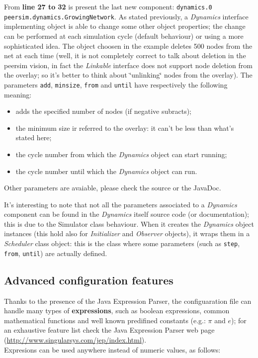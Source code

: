 \documentclass[a4paper,12pt]{article}
\begin{document}
From \textbf{line 27 to 32} is present the last new component: 
\texttt{dynamics.0
peersim.dynamics.GrowingNetwork}. As stated previously, a \emph{Dynamics}
interface implementing object is able to change some other object
properties; the change can be performed at each simulation cycle (default
behaviour) or using a more sophisticated idea. The object choosen
in the example deletes 500 nodes from the net at each time (well,
it is not completely correct to talk about deletion in the peersim
vision, in fact the \emph{Linkable} interface does not support node
deletion from the overlay; so it's better to think about \char`\"{}unlinking\char`\"{}
nodes from the overlay). The parameters \texttt{add}, \texttt{minsize},
\texttt{from} and \texttt{until} have respectively the following meaning:

\begin{itemize}
\item adds the specified number of nodes (if negative subracts);
\item the minimum size ir referred to the overlay: it can't be less than
what's stated here;
\item the cycle number from which the \emph{Dynamics} object can start running;
\item the cycle number until which the \emph{Dynamics} object can run.
\end{itemize}
Other parameters are avaiable, please check the source or the JavaDoc.

It's interesting to note that not all the parameters associated to
a \emph{Dynamics} component can be found in the \emph{Dynamics} itself
source code (or documentation); this is due to the Simulator class
behaviour. When it creates the \emph{Dynamics} object instances (this
hold also for \emph{Initializer} and \emph{Observer} objects), it
wraps them in a \emph{Scheduler} class object: this is the class where
some parameters (such as \texttt{step}, \texttt{from}, \texttt{until})
are actually defined.

\subsection{Advanced configuration features}

Thanks to the presence of the Java Expression Parser, the configuaration
file can handle many types of \textbf{expressions}, such as boolean 
expressions, 
common
mathematical functions and well known predifined constants (e.g.: $\pi$ 
and
$e$); for an exhaustive feature list check the Java Expression Parser
web page (\url{http://www.singularsys.com/jep/index.html}).\\
Expresions can be used anywhere instead of numeric values, as follows:
\end{document}
